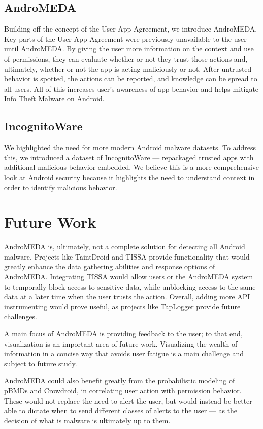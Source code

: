 \subsection{AndroMEDA}
Building off the concept of the User-App Agreement, we introduce AndroMEDA. Key parts of the User-App Agreement were previously unavailable to the user until AndroMEDA. By giving the user more information on the context and use of permissions, they can evaluate whether or not they trust those actions and, ultimately, whether or not the app is acting maliciously or not. After untrusted behavior is spotted, the actions can be reported, and knowledge can be spread to all users. All of this increases user's awareness of app behavior and helps mitigate Info Theft Malware on Android.

\subsection{IncognitoWare}
We highlighted the need for more modern Android malware datasets. To address this, we introduced a dataset of IncognitoWare --- repackaged trusted apps with additional malicious behavior embedded. We believe this is a more comprehensive look at Android security because it highlights the need to understand context in order to identify malicious behavior.

\section{Future Work}
\label{sec:futurework}
AndroMEDA is, ultimately, not a complete solution for detecting all Android malware. Projects like TaintDroid and TISSA provide functionality that would greatly enhance the data gathering abilities and response options of AndroMEDA. Integrating TISSA would allow users or the AndroMEDA system to temporally block access to sensitive data, while unblocking access to the same data at a later time when the user trusts the action. Overall, adding more API instrumenting would prove useful, as projects like TapLogger provide future challenges.

A main focus of AndroMEDA is providing feedback to the user; to that end, visualization is an important area of future work. Visualizing the wealth of information in a concise way that avoids user fatigue is a main challenge and subject to future study.

AndroMEDA could also benefit greatly from the probabilistic modeling of pBMDs and Crowdroid, in correlating user action with permission behavior. These would not replace the need to alert the user, but would instead be better able to dictate when to send different classes of alerts to the user --- as the decision of what is malware is ultimately up to them.


